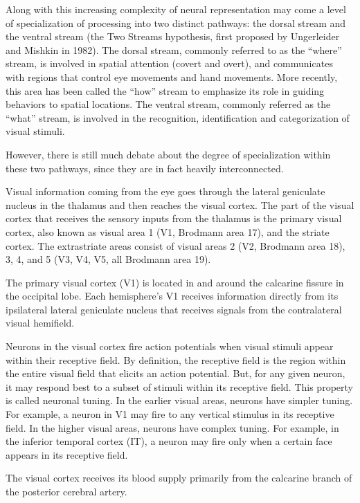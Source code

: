 Along with this increasing complexity of neural representation may come a level of specialization of processing into two distinct pathways: the dorsal stream and the ventral stream (the Two Streams hypothesis, first proposed by Ungerleider and Mishkin in 1982). The dorsal stream, commonly referred to as the ``where'' stream, is involved in spatial attention (covert and overt), and communicates with regions that control eye movements and hand movements. More recently, this area has been called the ``how'' stream to emphasize its role in guiding behaviors to spatial locations. The ventral stream, commonly referred as the ``what'' stream, is involved in the recognition, identification and categorization of visual stimuli.

However, there is still much debate about the degree of specialization within these two pathways, since they are in fact heavily interconnected.

Visual information coming from the eye goes through the lateral geniculate nucleus in the thalamus and then reaches the visual cortex. The part of the visual cortex that receives the sensory inputs from the thalamus is the primary visual cortex, also known as visual area 1 (V1, Brodmann area 17), and the striate cortex. The extrastriate areas consist of visual areas 2 (V2, Brodmann area 18), 3, 4, and 5 (V3, V4, V5, all Brodmann area 19).

The primary visual cortex (V1) is located in and around the calcarine fissure in the occipital lobe. Each hemisphere's V1 receives information directly from its ipsilateral lateral geniculate nucleus that receives signals from the contralateral visual hemifield.

Neurons in the visual cortex fire action potentials when visual stimuli appear within their receptive field. By definition, the receptive field is the region within the entire visual field that elicits an action potential. But, for any given neuron, it may respond best to a subset of stimuli within its receptive field. This property is called neuronal tuning. In the earlier visual areas, neurons have simpler tuning. For example, a neuron in V1 may fire to any vertical stimulus in its receptive field. In the higher visual areas, neurons have complex tuning. For example, in the inferior temporal cortex (IT), a neuron may fire only when a certain face appears in its receptive field.

The visual cortex receives its blood supply primarily from the calcarine branch of the posterior cerebral artery.

